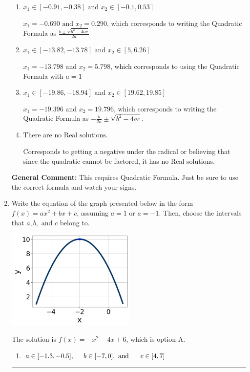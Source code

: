\documentclass{extbook}[14pt]
\newcommand{\litem}[1]{\item #1

\rule{\textwidth}{0.4pt}}
\begin{document}
\begin{enumerate}
{\begin{enumerate}[label=\Alph*.]
* $x_1 = -0.290 \text{ and } x_2 = 0.690$, which is the correct option.
\item \( x_1 \in [-0.91, -0.38] \text{ and } x_2 \in [-0.1, 0.53] \)

 $x_1 = -0.690 \text{ and } x_2 = 0.290$, which corresponds to writing the Quadratic Formula as $\frac{b \pm \sqrt{b^2 - 4ac}}{2a}$
\item \( x_1 \in [-13.82, -13.78] \text{ and } x_2 \in [5, 6.26] \)

 $x_1 = -13.798 \text{ and } x_2 = 5.798$, which corresponds to using the Quadratic Formula with $a=1$
\item \( x_1 \in [-19.86, -18.94] \text{ and } x_2 \in [19.62, 19.85] \)

 $x_1 = -19.396 \text{ and } x_2 = 19.796$, which corresponds to writing the Quadratic Formula as $-\frac{b}{2a} \pm \sqrt{b^2 - 4ac}$.
\item \( \text{There are no Real solutions.} \)

Corresponds to getting a negative under the radical or believing that since the quadratic cannot be factored, it has no Real solutions.
\end{enumerate}

\textbf{General Comment:} This requires Quadratic Formula. Just be sure to use the correct formula and watch your signs.
}
\litem{
Write the equation of the graph presented below in the form $f(x)=ax^2+bx+c$, assuming  $a=1$ or $a=-1$. Then, choose the intervals that $a, b,$ and $c$ belong to.

\begin{center}
    \includegraphics[width=0.5\textwidth]{../Figures/quadraticGraphToEquationCopyA.png}
\end{center}




The solution is \( f(x) = -x^{2} -4 x + 6 \), which is option A.\begin{enumerate}[label=\Alph*.]
\item \( a \in [-1.3, -0.5], \hspace*{5mm} b \in [-7, 0], \text{ and } \hspace*{5mm} c \in [4, 7] \)


\end{enumerate}}
\end{enumerate}
\end{document}
